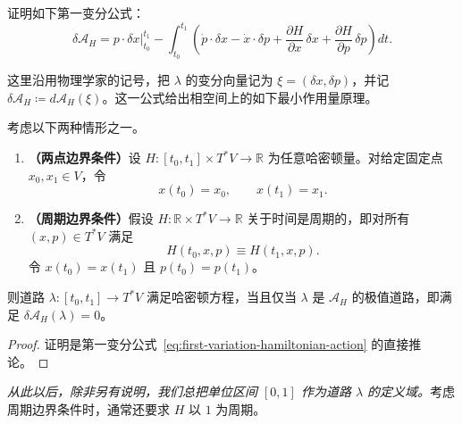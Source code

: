 \begin{exercise}
\label{ex:hamiltonian-action-first-variation}
证明如下第一变分公式：
\begin{equation}\label{eq:first-variation-hamiltonian-action}
  \delta\mathcal A_H
  =\left.p\cdot\delta x\right|_{t_0}^{t_1}
  -\int_{t_0}^{t_1}\left(
    \dot p\cdot\delta x-\dot x\cdot\delta p
    +\frac{\partial H}{\partial x}\,\delta x
    +\frac{\partial H}{\partial p}\,\delta p
  \right)dt.
\end{equation}
\end{exercise}

这里沿用物理学家的记号，把 $\lambda$ 的变分向量记为 $\xi=(\delta x,\delta p)$，并记 $\delta\mathcal A_H\coloneqq d\mathcal A_H(\xi)$。这一公式给出相空间上的如下最小作用量原理。

\begin{theorem}
\label{thm:hamilton-least-action}
考虑以下两种情形之一。
\begin{enumerate}[label=(\arabic*)]
  \item \textup{\bfseries（两点边界条件）}设 $H:[t_0,t_1]\times T^*V\to\mathbb R$ 为任意哈密顿量。对给定固定点 $x_0,x_1\in V$，令
  \[
    x(t_0)=x_0,\qquad x(t_1)=x_1.
  \]
  \item \textup{\bfseries（周期边界条件）}假设 $H:\mathbb R\times T^*V\to\mathbb R$ 关于时间是周期的，即对所有 $(x,p)\in T^*V$ 满足
  \[
    H(t_0,x,p)\equiv H(t_1,x,p).
  \]
  令 $x(t_0)=x(t_1)$ 且 $p(t_0)=p(t_1)$。
\end{enumerate}
则道路 $\lambda:[t_0,t_1]\to T^*V$ 满足哈密顿方程，当且仅当 $\lambda$ 是 $\mathcal A_H$ 的极值道路，即满足 $\delta\mathcal A_H(\lambda)=0$。
\end{theorem}

\begin{proof}
证明是第一变分公式~\eqref{eq:first-variation-hamiltonian-action} 的直接推论。
\end{proof}

\emph{从此以后，除非另有说明，我们总把单位区间 $[0,1]$ 作为道路 $\lambda$ 的定义域。}考虑周期边界条件时，通常还要求 $H$ 以 $1$ 为周期。
